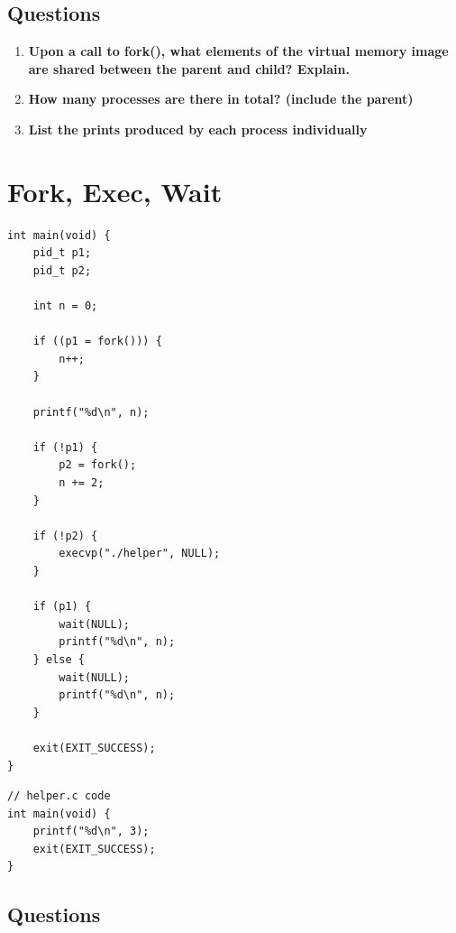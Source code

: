 \documentclass[14pt, a4paper]{article}
\begin{document}
\subsection*{Questions}

\begin{enumerate}
\item \textbf{Upon a call to fork(), what elements of the virtual memory image are shared between the parent and child? Explain.}

\vspace{15mm}

\item \textbf{How many processes are there in total? (include the parent)}

\vspace{15mm}

\item \textbf{List the prints produced by each process individually}

\vspace{15mm}

\end{enumerate}

\newpage

\section{Fork, Exec, Wait}

\begin{lstlisting}[style=cstyle]
int main(void) {
    pid_t p1;
    pid_t p2;
    
    int n = 0;

    if ((p1 = fork())) {
        n++;
    }

    printf("%d\n", n);

    if (!p1) {
        p2 = fork();
        n += 2;
    }

    if (!p2) {
        execvp("./helper", NULL);
    }

    if (p1) {
        wait(NULL);
        printf("%d\n", n);
    } else {
        wait(NULL);
        printf("%d\n", n);
    }

    exit(EXIT_SUCCESS);
}
\end{lstlisting}

\begin{lstlisting}[style=cstyle]
// helper.c code
int main(void) {
    printf("%d\n", 3);
    exit(EXIT_SUCCESS);
}
\end{lstlisting}

\subsection*{Questions}
\end{document}
